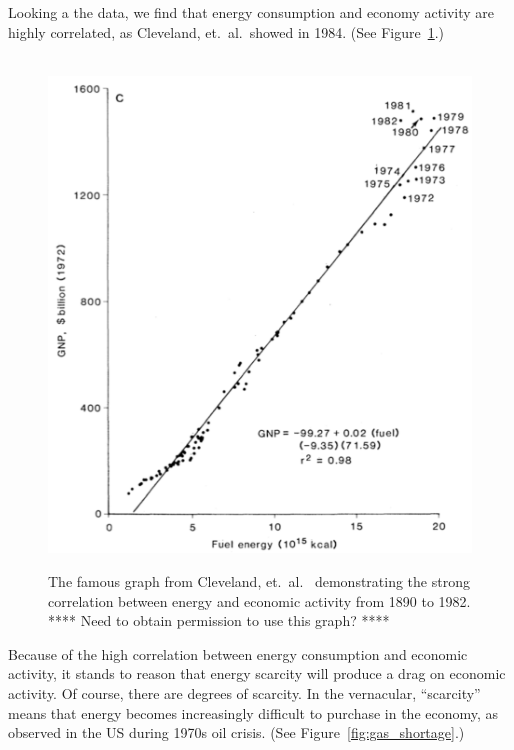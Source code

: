 Looking a the data, we find that 
energy consumption and economy activity are highly correlated,
as Cleveland, et.\ al.\ showed in 1984. 
(See Figure~\ref{fig:Cleveland1984}.)

\begin{figure}[!ht]
\centering\
\includegraphics[width=\linewidth]{Part_0/Chapter_Introduction/images/Cleveland1984.pdf}
\caption[Energy and economic activity]{The famous graph from Cleveland, et.\ al.\
\cite{Cleveland:1984aa}
demonstrating the strong correlation between energy and economic activity
from 1890 to 1982.
**** Need to obtain permission to use this graph? ****}
\label{fig:Cleveland1984}
\end{figure}

Because of the high correlation between energy consumption and economic activity,
it stands to reason that energy scarcity will produce a drag on economic activity.
Of course, there are degrees of scarcity. 
In the vernacular, ``scarcity'' means that energy 
becomes increasingly difficult to purchase in the economy,
as observed in the US during 1970s oil crisis.
(See Figure~\ref{fig:gas_shortage}.)

